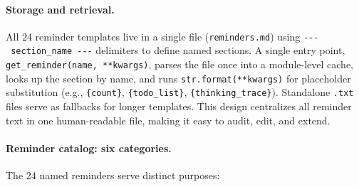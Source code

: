 \paragraph{Storage and retrieval.} All 24 reminder templates live in a single file (\texttt{reminders.md}) using \texttt{-{}-{}-~section\_name~-{}-{}-} delimiters to define named sections. A single entry point, \texttt{get\_reminder(name, **kwargs)}, parses the file once into a module-level cache, looks up the section by name, and runs \texttt{str.format(**kwargs)} for placeholder substitution (e.g., \texttt{\{count\}}, \texttt{\{todo\_list\}}, \texttt{\{thinking\_trace\}}). Standalone \texttt{.txt} files serve as fallbacks for longer templates. This design centralizes all reminder text in one human-readable file, making it easy to audit, edit, and extend.

\paragraph{Reminder catalog: six categories.} The 24 named reminders serve distinct purposes:

